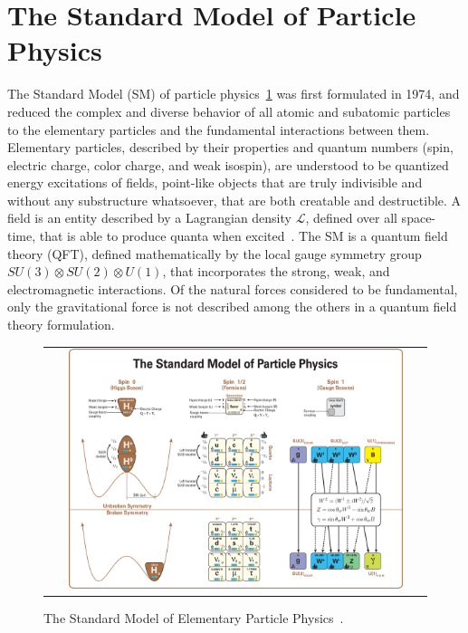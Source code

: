 \section{The Standard Model of Particle Physics}
The Standard Model (SM) of particle physics~\ref{Standard_Model} was first formulated in 1974, and reduced the complex and diverse behavior of all atomic and subatomic particles to the elementary particles and the fundamental interactions between them. 
Elementary particles, described by their properties and quantum numbers (spin, electric charge, color charge, and  weak isospin), are understood to be quantized energy excitations of fields, point-like objects that are truly indivisible and without any substructure whatsoever, that are both creatable and destructible.
A field is an entity described by a Lagrangian density $\mathcal{L}$, defined over all space-time, that is able to produce quanta when excited~\cite{nagashima_2013_V1}.
The SM is a quantum field theory (QFT), defined mathematically by the local gauge symmetry group $SU(3) \otimes SU(2) \otimes U(1)$, that incorporates the strong, weak, and electromagnetic interactions.
Of the natural forces considered to be fundamental, only the gravitational force is not described among the others in a quantum field theory formulation.
\begin{figure}[htb]
  \begin{center}
    \begin{tabular}{c}
        \includegraphics[width=0.90\textwidth]{fig_Theory/Standard_Model.png}
    \end{tabular}
    \caption{The Standard Model of Elementary Particle Physics~\cite{StandardModel}.
            }
    \label{Standard_Model}
  \end{center}
\end{figure}

